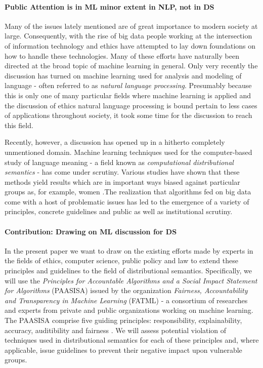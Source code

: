 \documentclass{article}
\begin{document}
\paragraph{Public Attention is in ML minor extent in NLP, not in DS}
Many of the issues lately mentioned are of great importance to modern society at large. Consequently, with the rise of big data people working at the intersection of information technology and ethics have attempted to lay down foundations on how to handle these technologies. Many of these efforts have naturally been directed at the broad topic of machine learning in general.\cite{leidner2017ehtical} Only very recently the discussion has turned on machine learning used for analysis and modeling of language - often referred to as \emph{natural language processing}. Presumably because this is only one of many particular fields where machine learning is applied and the discussion of ethics natural language processing is bound pertain to less cases of applications throughout society, it took some time for the discussion to reach this field.

Recently, however, a discussion has opened up in a hitherto completely unmentioned domain. Machine learning techniques used for the computer-based study of language meaning - a field known as \emph{computational distributional semantics} - has come under scrutiny.
Various studies have shown that these methods yield results which are in important ways biased against particular groups as, for example, women \cite{google} \cite{wagner2015s}.The realization that algorithms fed on big data come with a host of problematic issues has led to the emergence of a variety of principles, concrete guidelines and public as well as institutional scrutiny.

\paragraph{Contribution: Drawing on ML discussion for DS}
In the present paper we want to draw on the existing efforts made by experts in the fields of ethics, computer science, public policy and law to extend these principles and guidelines to the field of distributional semantics. Specifically, we will use the \emph{Principles for Accountable Algorithms and a Social Impact Statement for Algorithms} (PAASISA) issued by the organization \emph{Fairness, Accountability and Transparency in Machine Learning} (FATML) - a consortium of researches and experts from private and public organizations working on machine learning. 
The PAASISA comprise five guiding principles: responsibility, explainability, accuracy, auditibility and fairness \cite{principles}.
We will assess potential violation of techniques used in distributional semantics for each of these principles and, where applicable, issue guidelines to prevent their negative impact upon vulnerable groups. 
\end{document}
